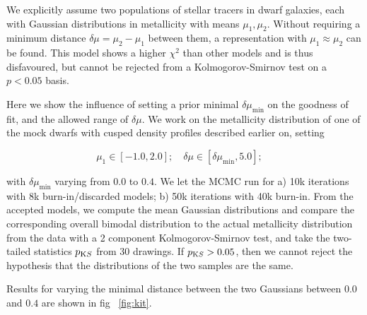 We explicitly assume two populations of stellar tracers in dwarf
galaxies, each with Gaussian distributions in metallicity with means
$\mu_1,\mu_2$. Without requiring a minimum distance $\delta
\mu=\mu_2-\mu_1$ between them, a representation with $\mu_1 \approx
\mu_2$ can be found. This model shows a higher $\chi^2$ than other
models and is thus disfavoured, but cannot be rejected from a
Kolmogorov-Smirnov test on a $p<0.05$ basis.

Here we show the influence of setting a prior minimal
$\delta\mu_{\min}$ on the goodness of fit, and the allowed range of
$\delta \mu$. We work on the metallicity distribution of one of the
mock dwarfs with cusped density profiles described earlier on, setting

\begin{equation}
\mu_1\in[-1.0,2.0];\quad \delta \mu \in [ \delta\mu_{\min}, 5.0];\quad
\end{equation}

with $\delta\mu_{\min}$ varying from $0.0$ to $0.4$. We let the MCMC
run for a) 10k iterations with 8k burn-in/discarded models; b) 50k
iterations with 40k burn-in. From the accepted models, we compute the
mean Gaussian distributions and compare the corresponding overall
bimodal distribution to the actual metallicity distribution from the
data with a 2 component Kolmogorov-Smirnov test, and take the
two-tailed statistics $p_{\text KS}$ from 30 drawings. If $p_{\text KS}>0.05$, then we
cannot reject the hypothesis that the distributions of the two samples
are the same.

Results for varying the minimal distance between the two Gaussians
between $0.0$ and $0.4$ are shown in fig ~\ref{fig:kit}.


